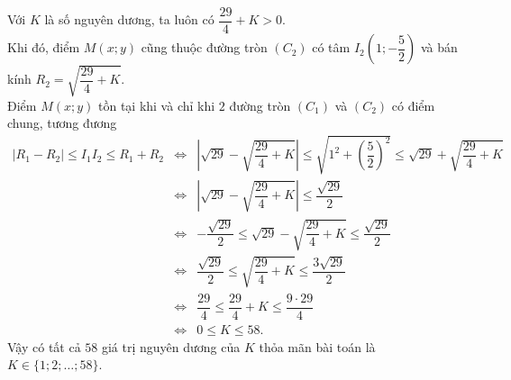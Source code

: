 \begin{ex}
{Với $K$ là số nguyên dương, ta luôn có $\dfrac{29}{4}+K > 0$.\\
Khi đó, điểm $M(x;y)$ cũng thuộc đường tròn $(C_2)$ có tâm $I_2\left(1;-\dfrac{5}{2}\right)$ và bán kính $R_2=\sqrt{\dfrac{29}{4}+K}$.\\
Điểm $M(x;y)$ tồn tại khi và chỉ khi $2$ đường tròn $(C_1)$ và $(C_2)$ có điểm chung, tương đương
\begin{eqnarray*}
\left|R_1-R_2\right| \le I_1I_2 \le R_1+R_2 &\Leftrightarrow& \left|\sqrt{29}-\sqrt{\dfrac{29}{4}+K}\right| \le \sqrt{1^2+\left(\dfrac{5}{2}\right)^2} \le \sqrt{29}+\sqrt{\dfrac{29}{4}+K}\\
&\Leftrightarrow & \left|\sqrt{29}-\sqrt{\dfrac{29}{4}+K}\right| \le \dfrac{\sqrt{29}}{2}\\
&\Leftrightarrow &-\dfrac{\sqrt{29}}{2}\le \sqrt{29}-\sqrt{\dfrac{29}{4}+K} \le \dfrac{\sqrt{29}}{2}\\
&\Leftrightarrow &\dfrac{\sqrt{29}}{2} \le \sqrt{\dfrac{29}{4}+K} \le \dfrac{3\sqrt{29}}{2}\\
&\Leftrightarrow &\dfrac{29}{4} \le \dfrac{29}{4}+K\le \dfrac{9\cdot 29}{4}\\
&\Leftrightarrow &0 \le K \le 58.
\end{eqnarray*}
Vậy có tất cả $58$ giá trị nguyên dương của $K$ thỏa mãn bài toán là $K \in \{1;2;\ldots;58\}$.
}
\end{ex}

